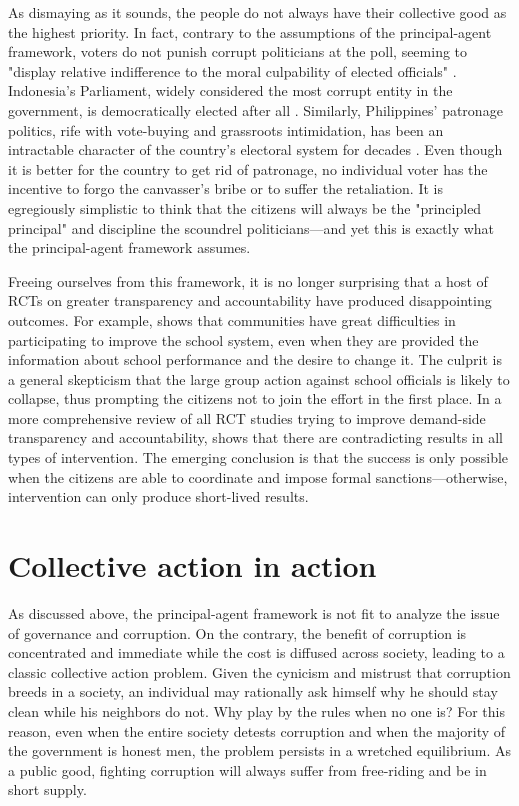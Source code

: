 \documentclass[12pt]{article}
\begin{document}
As dismaying as it sounds, the people do not always have their collective good as the highest priority. In fact, contrary to the assumptions of the principal-agent framework, voters do not punish corrupt politicians at the poll, seeming to "display relative indifference to the moral culpability of elected officials" \citep{Chang2007}. Indonesia's Parliament, widely considered the most corrupt entity in the government, is democratically elected after all \citep{Integrity2012a}. Similarly, Philippines' patronage politics, rife with vote-buying and grassroots intimidation, has been an intractable character of the country's electoral system for decades \citep{Sidel1999}. Even though it is better for the country to get rid of patronage, no individual voter has the incentive to forgo the canvasser's bribe or to suffer the retaliation. It is egregiously simplistic to think that the citizens will always be the "principled principal" and discipline the scoundrel politicians---and yet this is exactly what the principal-agent framework assumes.

Freeing ourselves from this framework, it is no longer surprising that a host of RCTs on greater transparency and accountability have produced disappointing outcomes. For example, \citet{Banerjee2010} shows that communities have great difficulties in participating to improve the school system, even when they are provided the information about school performance and the desire to change it. The culprit is a general skepticism that the large group action against school officials is likely to collapse, thus prompting the citizens not to join the effort in the first place. In a more comprehensive review of all RCT studies trying to improve demand-side transparency and accountability, \citet{Joshi2010a} shows that there are contradicting results in all types of intervention. The emerging conclusion is that the success is only possible when the citizens are able to coordinate and impose formal sanctions---otherwise, intervention can only produce short-lived results.

\section{Collective action in action}
\label{sec:collectiveaction}

As discussed above, the principal-agent framework is not fit to analyze the issue of governance and corruption. On the contrary, the benefit of corruption is concentrated and immediate while the cost is diffused across society, leading to a classic collective action problem. Given the cynicism and mistrust that corruption breeds in a society, an individual may rationally ask himself why he should stay clean while his neighbors do not. Why play by the rules when no one is? For this reason, even when the entire society detests corruption and when the majority of the government is honest men, the problem persists in a wretched equilibrium. As a public good, fighting corruption will always suffer from free-riding and be in short supply.
\end{document}
